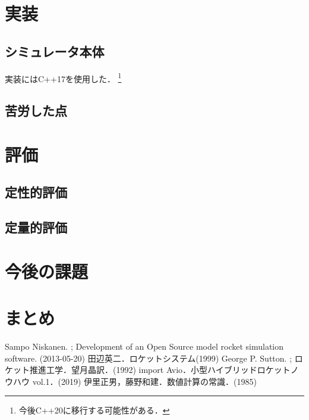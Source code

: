 \documentclass[a4j,10pt]{jsarticle}
\begin{document}
\section{実装}

\subsection{シミュレータ本体}

実装にはC++17を使用した．
\footnote{今後C++20に移行する可能性がある．}

\subsection{苦労した点}


\section{評価}
\subsection{定性的評価}

\subsection{定量的評価}

\section{今後の課題}

\section{まとめ}

% 
% 

\begin{thebibliography}{99}
		Sampo Niskanen. ; Development of an Open Source model rocket simulation software. (2013-05-20)
		田辺英二．ロケットシステム(1999)
		George P. Sutton. ; ロケット推進工学．望月晶訳．(1992)
		import Avio．小型ハイブリッドロケットノウハウ vol.1．(2019)
		伊里正男，藤野和建．数値計算の常識．(1985)
\end{thebibliography}
\end{document}
